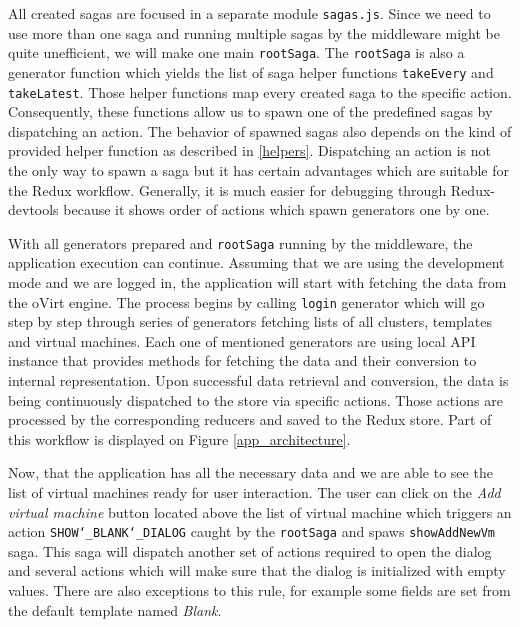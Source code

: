All created sagas are focused in a separate module \texttt{sagas.js}. Since we need to use more than one saga and running multiple sagas by the middleware might be quite unefficient, we will make one main \texttt{rootSaga}. The \texttt{rootSaga} is also a generator function which yields the list of saga helper functions \texttt{takeEvery} and \texttt{takeLatest}. Those helper functions map every created saga to the specific action. Consequently, these functions allow us to spawn one of the predefined sagas by dispatching an action. The behavior of spawned sagas also depends on the kind of provided helper function as described in \ref{helpers}. Dispatching an action is not the only way to spawn a saga but it has certain advantages which are suitable for the Redux workflow. Generally, it is much easier for debugging through Redux-devtools because it shows order of actions which spawn generators one by one.

With all generators prepared and \texttt{rootSaga} running by the middleware, the application execution can continue. Assuming that we are using the development mode and we are logged in, the application will start with fetching the data from the oVirt engine. The process begins by calling \texttt{login} generator which will go step by step through series of generators fetching lists of all clusters, templates and virtual machines. Each one of mentioned generators are using local API instance that provides methods for fetching the data and their conversion to internal representation. Upon successful data retrieval and conversion, the data is being continuously dispatched to the store via specific actions. Those actions are processed by the corresponding reducers and saved to the Redux store. Part of this workflow is displayed on 
Figure \ref{app_architecture}.

Now, that the application has all the necessary data and we are able to see the list of virtual machines ready for user interaction. The user can click on the \textit{Add virtual machine} button located above the list of virtual machine which triggers an action \texttt{SHOW\char`_BLANK\char`_DIALOG} caught by the \texttt{rootSaga} and spaws \texttt{showAddNewVm} saga. This saga will dispatch another set of actions required to open the dialog and several actions which will make sure that the dialog is initialized with empty values. There are also exceptions to this rule, for example some fields are set from the default template named \textit{Blank}. 


